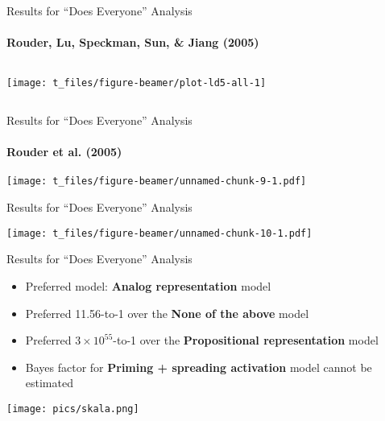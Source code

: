 \documentclass[ignorenonframetext,t]{beamer}
\providecommand{\tightlist}{%
  \setlength{\itemsep}{0pt}\setlength{\parskip}{0pt}}
\begin{document}
\begin{frame}{Results for ``Does Everyone'' Analysis}

\framesubtitle{Rouder, Lu, Speckman, Sun, \& Jiang (2005)}

\vspace*{.5cm}

\begin{columns}


\begin{center}\texttt{[image: t\_files/figure-beamer/plot-ld5-all-1]} \end{center}

\end{columns}

\end{frame}

\begin{frame}{Results for ``Does Everyone'' Analysis}

\framesubtitle{Rouder et al. (2005)}

\vspace*{1cm}

\texttt{[image: t\_files/figure-beamer/unnamed-chunk-9-1.pdf]}

\end{frame}

\begin{frame}{Results for ``Does Everyone'' Analysis}

\vspace*{1cm}

\texttt{[image: t\_files/figure-beamer/unnamed-chunk-10-1.pdf]}

\end{frame}

\begin{frame}{Results for ``Does Everyone'' Analysis}

\vspace*{.2cm}

\begin{itemize}[<+->]
\tightlist
\item
  Preferred model: \textbf{Analog representation} model
\end{itemize}

\begin{itemize}[<+->]
\tightlist
\item
  Preferred 11.56-to-1 over the \textbf{None of the above} model
\end{itemize}

\begin{itemize}[<+->]
\tightlist
\item
  Preferred \(3 \times 10^{55}\)-to-1 over the \textbf{Propositional
  representation} model
\end{itemize}

\begin{itemize}[<+->]
\tightlist
\item
  Bayes factor for \textbf{Priming + spreading activation} model cannot
  be estimated
\end{itemize}

\centering \texttt{[image: pics/skala.png]}

\end{frame}
\end{document}
